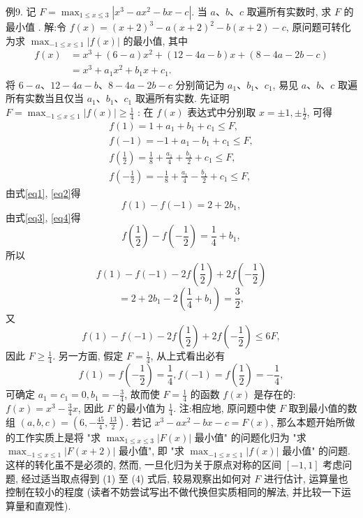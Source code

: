 例9. 记 $F=\max _{1 \leqslant x \leqslant 3}\left|x^3-a x^2-b x-c\right|$. 当 $a 、 b 、 c$ 取遍所有实数时, 求 $F$ 的最小值 .
解:令 $f(x)=(x+2)^3-a(x+2)^2-b(x+2)-c$, 原问题可转化为求 $\max _{-1 \leqslant x \leqslant 1}|f(x)|$ 的最小值, 其中
$$
\begin{aligned}
f(x) & =x^3+(6-a) x^2+(12-4 a-b) x+(8-4 a-2 b-c) \\
& =x^3+a_1 x^2+b_1 x+c_1 .
\end{aligned}
$$
将 $6-a 、 12-4 a-b 、 8-4 a-2 b-c$ 分别简记为 $a_1 、 b_1 、 c_1$, 易见 $a 、 b 、 c$ 取遍所有实数当且仅当 $a_1 、 b_1 、 c_1$ 取遍所有实数.
先证明 $F=\max _{-1 \leqslant x \leqslant 1}|f(x)| \geqslant \frac{1}{4}$ : 在 $f(x)$ 表达式中分别取 $x= \pm 1, \pm \frac{1}{2}$, 可得
$$
\begin{gathered}
f(1)=1+a_1+b_1+c_1 \leqslant F, \label{eq1}\\
f(-1)=-1+a_1-b_1+c_1 \leqslant F,  \label{eq2}\\
f\left(\frac{1}{2}\right)=\frac{1}{8}+\frac{a_1}{4}+\frac{b_1}{2}+c_1 \leqslant F, \label{eq3} \\
f\left(-\frac{1}{2}\right)=-\frac{1}{8}+\frac{a_1}{4}-\frac{b_1}{2}+c_1 \leqslant F, \label{eq4}
\end{gathered}
$$
由式\ref{eq1}, \ref{eq2}得
$$
f(1)-f(-1)=2+2 b_1,
$$
由式\ref{eq3}, \ref{eq4}得
$$
f\left(\frac{1}{2}\right)-f\left(-\frac{1}{2}\right)=\frac{1}{4}+b_1,
$$
所以
$$
f(1)-f(-1)-2 f\left(\frac{1}{2}\right)+2 f\left(-\frac{1}{2}\right)
$$
$$
=2+2 b_1-2\left(\frac{1}{4}+b_1\right)=\frac{3}{2},
$$
又
$$
f(1)-f(-1)-2 f\left(\frac{1}{2}\right)+2 f\left(-\frac{1}{2}\right) \leqslant 6 F,
$$
因此 $F \geqslant \frac{1}{4}$.
另一方面, 假定 $F=\frac{1}{4}$, 从上式看出必有
$$
f(1)=f\left(-\frac{1}{2}\right)=\frac{1}{4}, f(-1)=f\left(\frac{1}{2}\right)=-\frac{1}{4},
$$
可确定 $a_1=c_1=0, b_1=-\frac{3}{4}$, 故而使 $F=\frac{1}{4}$ 的函数 $f(x)$ 是存在的: $f(x)= x^3-\frac{3}{4} x$, 因此 $F$ 的最小值为 $\frac{1}{4}$.
注:相应地, 原问题中使 $F$ 取到最小值的数组 $(a, b, c)= \left(6,-\frac{45}{4}, \frac{13}{2}\right)$.
若记 $x^3-a x^2-b x-c=F(x)$, 那么本题开始所做的工作实质上是将 "求 $\max _{1 \leqslant x \leqslant 3}|F(x)|$ 最小值" 的问题化归为 "求 $\max _{-1 \leqslant x \leqslant 1}|F(x+2)|$ 最小值", 即 "求 $\max _{-1 \leqslant x \leqslant 1}|f(x)|$ 最小值" 的问题.
这样的转化虽不是必须的, 然而, 一旦化归为关于原点对称的区间 $[-1,1]$ 考虑问题, 经过适当取点得到 (1) 至 (4) 式后, 较易观察出如何对 $F$ 进行估计, 运算量也控制在较小的程度 (读者不妨尝试写出不做代换但实质相同的解法, 并比较一下运算量和直观性).


